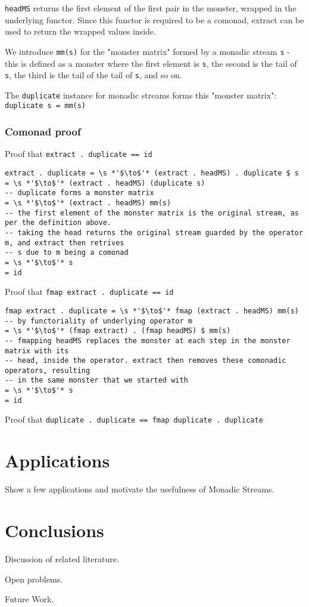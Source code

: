 \documentclass{article}
\begin{document}
\verb+headMS+ returns the first element of the first pair in the monster, wrapped in the underlying functor. Since this functor is required to be a comonad, extract can be used to return the wrapped values inside.

We introduce \verb+mm(s)+ for the "monster matrix" formed by a monadic stream \verb+s+ - this is defined as a monster where the first element is \verb+s+, the second is the tail of \verb+s+, the third is the tail of the tail of \verb+s+, and so on.

The \verb+duplicate+ instance for monadic streams forms this "monster matrix": \verb+duplicate s = mm(s)+

\subsubsection{Comonad proof}

Proof that \verb+extract . duplicate == id+

\begin{lstlisting}
extract . duplicate = \s *'$\to$'* (extract . headMS) . duplicate $ s
= \s *'$\to$'* (extract . headMS) (duplicate s)
-- duplicate forms a monster matrix
= \s *'$\to$'* (extract . headMS) mm(s)
-- the first element of the monster matrix is the original stream, as per the definition above.
-- taking the head returns the original stream guarded by the operator m, and extract then retrives 
-- s due to m being a comonad
= \s *'$\to$'* s
= id
\end{lstlisting}

Proof that \verb+fmap extract . duplicate == id+

\begin{lstlisting}
fmap extract . duplicate = \s *'$\to$'* fmap (extract . headMS) mm(s)
-- by functoriality of underlying operator m
= \s *'$\to$'* (fmap extract) . (fmap headMS) $ mm(s)
-- fmapping headMS replaces the monster at each step in the monster matrix with its
-- head, inside the operator. extract then removes these comonadic operators, resulting 
-- in the same monster that we started with
= \s *'$\to$'* s
= id
\end{lstlisting}

Proof that \verb+duplicate . duplicate == fmap duplicate . duplicate+

\section{Applications}

Show a few applications and motivate the usefulness of Monadic Streams.

\section{Conclusions}

Discussion of related literature.

Open problems.

Future Work.


\end{document}
